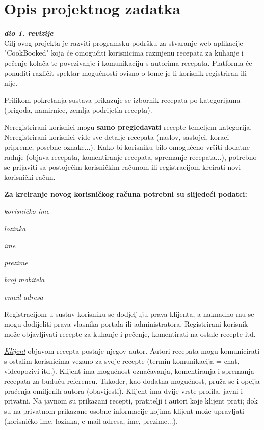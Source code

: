\chapter{Opis projektnog zadatka}
		
		\textbf{\textit{dio 1. revizije}}\\
		
		Cilj ovog projekta je razviti programsku podršku za stvaranje web aplikacije "CookBooked" koja će
		omogućiti korisnicima razmjenu recepata za kuhanje i pečenje kolača te povezivanje i komunikaciju s autorima
		recepata. Platforma će ponuditi različit spektar mogućnosti ovisno o tome je li korisnik registriran ili nije.

		Prilikom pokretanja sustava prikazuje se izbornik recepata po kategorijama (prigoda, namirnice, zemlja podrijetla recepta).		
		
		Neregistrirani korisnici mogu \textbf{samo pregledavati} recepte temeljem kategorija.
		Neregistrirani korisnici vide sve detalje recepata (naslov, sastojci, koraci pripreme, posebne oznake...).
		Kako bi korisniku bilo omogućeno vršiti dodatne radnje (objava recepata, komentiranje recepata, spremanje recepata...),
		potrebno se prijaviti sa postojećim korisničkim računom ili registracijom kreirati novi korisnički račun.

		\textbf{
			Za kreiranje novog korisničkog računa potrebni su slijedeći podatci:
		}
		\begin{packed_item}
			\item \textit{korisničko ime}
			\item \textit{lozinka}
			\item \textit{ime}
			\item \textit{prezime}
			\item \textit{broj mobitela}
			\item \textit{email adresa}
		\end{packed_item}

		Registracijom u sustav korisniku se dodjeljuju prava klijenta, a naknadno mu se mogu dodijeliti prava
		vlasnika portala ili administratora. Registrirani korisnik može objavljivati recepte za kuhanje i pečenje,
		komentirati na ostale recepte itd.
				
		\underline{\textit{Klijent}} objavom recepta postaje njegov autor. Autori recepata mogu komunicirati s ostalim
		korisnicima vezano za svoje recepte (termin komunikacija = chat, videopozivi itd.). Klijent ima mogućnost označavanja, 
		komentiranja i spremanja recepata za buduću referencu. Također, kao dodatna mogućnost, pruža se i opcija praćenja 
		omiljenih autora (obavijesti). Klijent ima dvije vrste profila, javni i privatni. Na javnom su prikazani recepti,
		pratitelji i autori koje klijent prati; dok su na privatnom prikazane osobne informacije kojima klijent može
		upravljati (korisničko ime, lozinka, e-mail adresa, ime, prezime...).
		
